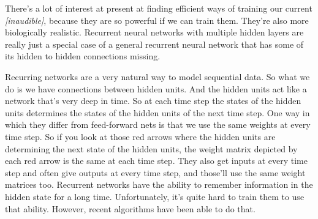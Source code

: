 \begin{multicols}{2}
\begin{footnotesize}
There's a lot of interest at present at finding efficient ways of training our current \emph{[inaudible]}, because they are so powerful if we can train them. They're also more biologically realistic. Recurrent neural networks with multiple hidden layers are really just a special case of a general recurrent neural network that has some of its hidden to hidden connections missing. 

Recurring networks are a very natural way to model sequential data.
So what we do is we have connections between hidden units. And the hidden units act like a network that's very deep in time. So at each time step the states of the hidden units determines the states of the hidden units of the next time step. One way in which they differ from feed-forward nets is that we use the same weights at every time step. So if you look at those red arrows where the hidden units are determining the next state of the hidden units, the weight matrix depicted by each red arrow is the same at each time step. They also get inputs at every time step and often give outputs at every time step, and those'll use the same weight matrices too. Recurrent networks have the ability to remember information in the hidden state for a long time. Unfortunately, it's quite hard to train them to use that ability. However, recent algorithms have been able to do that. 


\end{footnotesize}
\end{multicols}
